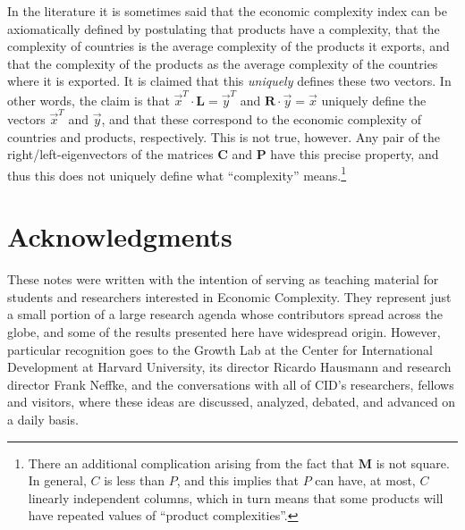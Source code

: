 \documentclass[12pt]{article}
\newcommand{\mtx}[1]{\mathbf{ #1}}
\begin{document}
In the literature it is sometimes said that the economic complexity index can be axiomatically defined by postulating that products have a complexity, that the complexity of countries is the average complexity of the products it exports, and that the complexity of the products as the average complexity of the countries where it is exported. It is claimed that this \emph{uniquely} defines these two vectors. In other words, the claim is that $\vec{x}^T\cdot\mtx{L}=\vec{y}^T$ and $\mtx{R}\cdot\vec{y}=\vec{x}$ uniquely define the vectors $\vec{x}^T$ and $\vec{y}$, and that these correspond to the economic complexity of countries and products, respectively. This is not true, however. Any pair of the right/left-eigenvectors of the matrices $\mtx{C}$ and $\mtx{P}$ have this precise property, and thus this does not uniquely define what ``complexity'' means.\footnote{There an additional complication arising from the fact that $\mtx{M}$ is not square. In general, $C$ is less than $P$, and this implies that $P$ can have, at most, $C$ linearly independent columns, which in turn means that some products will have repeated values of ``product complexities''.} 



\newpage
\section*{Acknowledgments}
These notes were written with the intention of serving as teaching material for students and researchers interested in Economic Complexity. They represent just a small portion of a large research agenda whose contributors spread across the globe, and some of the results presented here have widespread origin. However, particular recognition goes to the Growth Lab at the Center for International Development at Harvard University, its director Ricardo Hausmann and research director Frank Neffke, and the conversations with all of CID's researchers, fellows and visitors, where these ideas are discussed, analyzed, debated, and advanced on a daily basis. %




\begin{footnotesize}

\end{footnotesize}
\end{document}
